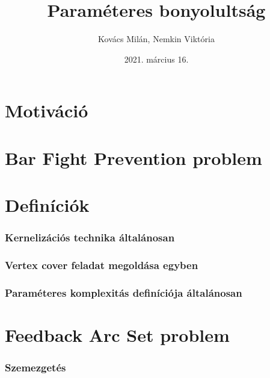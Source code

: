 \documentclass[aspectratio=169]{beamer}
\begin{document}
\title{Paraméteres bonyolultság}
\author{Kovács Milán, Nemkin Viktória}
\date{2021. március 16.}

\frame{\titlepage}


\section{Motiváció}






\section{Bar Fight Prevention problem}









\section{Definíciók}

\begin{frame}
\frametitle{Kernelizációs technika általánosan}

\end{frame}


\begin{frame}
\frametitle{Vertex cover feladat megoldása egyben}
\end{frame}

\begin{frame}
\frametitle{Paraméteres komplexitás definíciója általánosan}
\end{frame}

\section{Feedback Arc Set problem}

\begin{frame}
\frametitle{Szemezgetés}
\end{frame}
\end{document}
